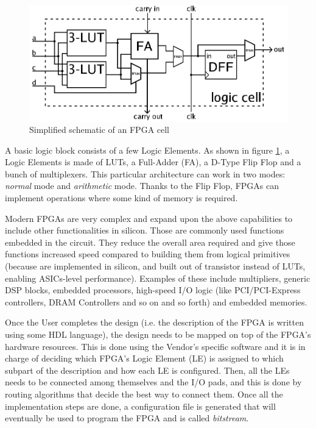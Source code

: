 \begin{figure}[H]
\centering
\includegraphics[width=1.0\linewidth]{images/chapter2/FPGA_cell_example.png}
\caption{Simplified schematic of an FPGA cell}
\label{fig:fpga_cell}
\end{figure}

A basic logic block consists of a few Logic Elements. As shown in figure \ref{fig:fpga_cell}, a Logic Elements is made of LUTs, a Full-Adder (FA), a D-Type Flip Flop and a bunch of multiplexers. This particular architecture can work in two modes: \textit{normal} mode and \textit{arithmetic} mode. Thanks to the Flip Flop, FPGAs can implement operations where some kind of memory is required.\bigskip

Modern FPGAs are very complex and expand upon the above capabilities to include other functionalities in silicon. Those are commonly used functions embedded in the circuit. They reduce the overall area required and give those functions increased speed compared to building them from logical primitives (because are implemented in silicon, and built out of transistor instead of LUTs, enabling ASICs-level performance). Examples of these include multipliers, generic DSP blocks, embedded processors, high-speed I/O logic (like PCI/PCI-Express controllers, DRAM Controllers and so on and so forth) and embedded memories. \bigskip

Once the User completes the design (i.e. the description of the FPGA is written using some HDL language), the design needs to be mapped on top of the FPGA's hardware resources. This is done using the Vendor's specific software and it is in charge of deciding which FPGA's Logic Element (LE) is assigned to which subpart of the description and how each LE is configured. Then, all the LEs needs to be connected among themselves and the I/O pads, and this is done by routing algorithms that decide the best way to connect them. Once all the implementation steps are done, a configuration file is generated that will eventually be used to program the FPGA and is called \textit{bitstream}.\bigskip

